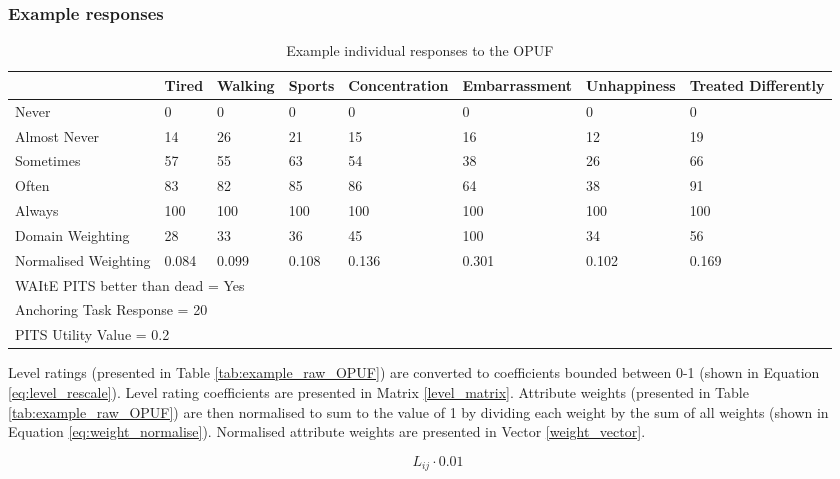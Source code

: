 \documentclass[
  letterpaper,
  DIV=11,
  numbers=noendperiod]{scrartcl}
\begin{document}
\subsubsection{Example responses}\label{example-responses}

\begin{table}[ht]
\centering
\caption{Example individual responses to the OPUF}

\footnotesize
\begin{tabular}{p{2cm} p{0.6cm} p{0.9cm} p{0.6cm} p{1.8cm} p{2cm} p{1.6cm} p{2.8cm}}
\toprule
& Tired & Walking & Sports & Concentration & Embarrassment & Unhappiness & Treated Differently \\
\midrule
Never          & 0 & 0 & 0 & 0 & 0 & 0 & 0 \\
Almost Never   & 14 & 26 & 21 & 15 & 16 & 12 & 19 \\
Sometimes      & 57 & 55 & 63 & 54 & 38 & 26 & 66 \\
Often          & 83 & 82 & 85 & 86 & 64 & 38 & 91 \\
Always         & 100 & 100 & 100 & 100 & 100 & 100 & 100 \\
\midrule
Domain Weighting & 28 & 33 & 36 & 45 & 100 & 34 & 56 \\
Normalised Weighting & 0.084 & 0.099 & 0.108 & 0.136 & 0.301 & 0.102 & 0.169 \\
\midrule
\multicolumn{8}{l}{WAItE PITS better than dead = Yes} \\
\multicolumn{8}{l}{Anchoring Task Response = 20} \\
\multicolumn{8}{l}{PITS Utility Value = 0.2} \\
\bottomrule
\end{tabular}
\end{table}

Level ratings (presented in Table \ref{tab:example_raw_OPUF}) are
converted to coefficients bounded between 0-1 (shown in Equation
\ref{eq:level_rescale}). Level rating coefficients are presented in
Matrix \ref{level_matrix}. Attribute weights (presented in Table
\ref{tab:example_raw_OPUF}) are then normalised to sum to the value of 1
by dividing each weight by the sum of all weights (shown in Equation
\ref{eq:weight_normalise}). Normalised attribute weights are presented
in Vector \ref{weight_vector}.

\begin{equation}\label{eq:level_rescale}
    L_{ij} \cdot 0.01
\end{equation}
\end{document}
